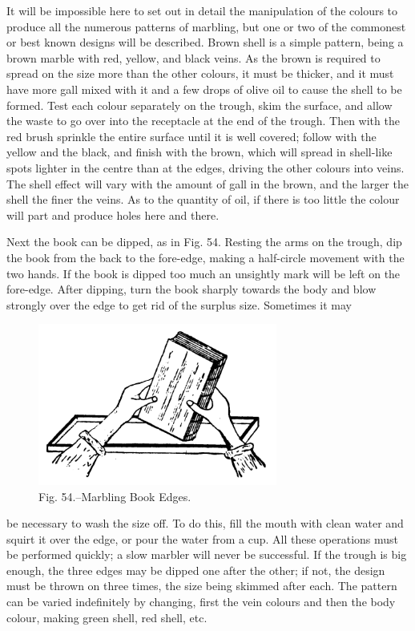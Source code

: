\documentclass[twoside]{book}
\begin{document}
It will be impossible here to set out in detail the
manipulation of the colours to produce all the
numerous patterns of marbling, but one or two of the
commonest or best known designs will be described.
Brown shell is a simple pattern, being a brown
marble with red, yellow, and black veins. As the
brown is required to spread on the size more than
the other colours, it must be thicker, and it must
have more gall mixed with it and a few drops of
olive oil to cause the shell to be formed. Test each
colour separately on the trough, skim the surface,
and allow the waste to go over into the receptacle
at the end of the trough. Then with the red brush
sprinkle the entire surface until it is well covered;
follow with the yellow and the black, and finish
with the brown, which will spread in shell-like spots
lighter in the centre than at the edges, driving the
other colours into veins. The shell effect will vary
\pagebreak
with the amount of gall in the brown, and the larger
the shell the finer the veins. As to the quantity
of oil, if there is too little the colour will part
and produce holes here and there.

Next the book can be dipped, as in Fig. 54.
Resting the arms on the trough, dip the book from
the back to the fore-edge, making a half-circle
movement with the two hands. If the book is
dipped too much an unsightly mark will be left on
the fore-edge. After dipping, turn the book sharply
towards the body and blow strongly over the edge
to get rid of the surplus size. Sometimes it may
	\begin{figure}[h]
		\centering
		\includegraphics[width=0.7\textwidth]{Figures/_054.png}
		\caption*{Fig. 54.--Marbling Book Edges.}
	\end{figure}
be necessary to wash the size off. To do this, fill
the mouth with clean water and squirt it over the
edge, or pour the water from a cup. All these
operations must be performed quickly; a slow marbler
will never be successful. If the trough is big
enough, the three edges may be dipped one after
the other; if not, the design must be thrown on
three times, the size being skimmed after each. The
pattern can be varied indefinitely by changing, first
the vein colours and then the body colour, making
green shell, red shell, etc.
\end{document}
